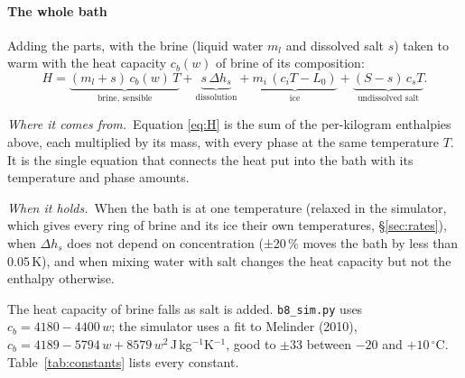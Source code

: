 \documentclass[11pt,a4paper]{article}
\newcommand{\dC}{\,^{\circ}\mathrm{C}}
\newcommand{\code}[1]{\texttt{#1}}
\newcommand{\where}{\par\noindent\textit{Where it comes from.}\ }
\newcommand{\holds}{\par\noindent\textit{When it holds.}\ }
\begin{document}
\paragraph{The whole bath} Adding the parts, with the brine (liquid water $m_l$ and dissolved salt
$s$) taken to warm with the heat capacity $c_b(w)$ of brine of its composition:
\begin{equation}
H = \underbrace{(m_l+s)\,c_b(w)\,T}_{\text{brine, sensible}}
  + \underbrace{s\,\Delta h_s}_{\text{dissolution}}
  + \underbrace{m_i\,(c_i T - L_0)}_{\text{ice}}
  + \underbrace{(S-s)\,c_s T}_{\text{undissolved salt}} .
\label{eq:H}
\end{equation}
\where Equation \eqref{eq:H} is the sum of the per-kilogram enthalpies above, each multiplied by its
mass, with every phase at the same temperature $T$. It is the single equation that connects the heat
put into the bath with its temperature and phase amounts.
\holds When the bath is at one temperature (relaxed in the simulator, which gives every ring of
brine and its ice their own temperatures, §\ref{sec:rates}), when $\Delta h_s$ does not depend on
concentration (±20\,\% moves the bath by less than 0.05\,K), and when mixing water with salt changes
the heat capacity but not the enthalpy otherwise.

The heat capacity of brine falls as salt is added. \code{b8\_sim.py} uses $c_b = 4180 - 4400\,w$;
the simulator uses a fit to Melinder (2010), $c_b = 4189 - 5794\,w + 8579\,w^2$\,J\,kg$^{-1}$K$^{-1}$,
good to $\pm 33$ between $-20$ and $+10\dC$. Table~\ref{tab:constants} lists every constant.
\end{document}
